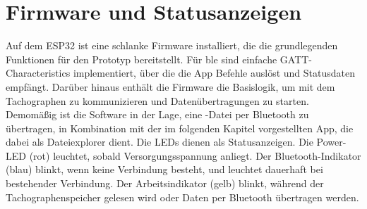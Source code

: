 \section{Firmware und Statusanzeigen}
Auf dem ESP32 ist eine schlanke Firmware installiert, die die grundlegenden Funktionen für den Prototyp bereitstellt. Für \gls{ble} sind einfache GATT-Characteristics implementiert, über die die App Befehle auslöst und Statusdaten empfängt. Darüber hinaus enthält die Firmware die Basislogik, um mit dem Tachographen zu kommunizieren und Datenübertragungen zu starten. Demomäßig ist die Software in der Lage, eine -Datei per Bluetooth zu übertragen, in Kombination mit der im folgenden Kapitel vorgestellten App, die dabei als Dateiexplorer dient. Die LEDs dienen als Statusanzeigen. Die Power-LED (rot) leuchtet, sobald Versorgungsspannung anliegt. Der Bluetooth-Indikator (blau) blinkt, wenn keine Verbindung besteht, und leuchtet dauerhaft bei bestehender Verbindung. Der Arbeitsindikator (gelb) blinkt, während der Tachographenspeicher gelesen wird oder Daten per Bluetooth übertragen werden.
